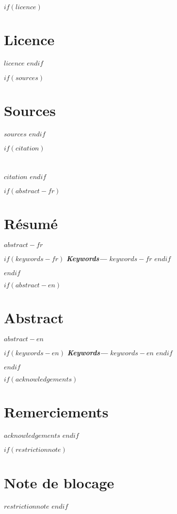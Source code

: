 \renewcommand{\contentsname}{Table des matières}
\renewcommand{\figurename}{Illustration}
\renewcommand{\listfigurename}{Table des figures}
\renewcommand{\listfigurename}{Table des figures}
\renewcommand{\listtablename}{Liste des tableaux}
\renewcommand{\chaptername}{Chapitre}
\renewcommand{\appendixname}{Annexe}

$if(licence)$
    \chapter*{Licence}
    $licence$
$endif$

$if(sources)$
    \chapter*{Sources}
    $sources$
$endif$

$if(citation)$
    \chapter*{}
    $citation$
$endif$

\providecommand{\keywords}[1]{\textbf{\textit{Keywords---}} #1}

$if(abstract-fr)$
\clearpage
\begin{minipage}{\linewidth}
    
    \chapter*{Résumé}
    $abstract-fr$
    
    \vspace*{1cm}
    
    $if(keywords-fr)$
        \keywords{$keywords-fr$}
    $endif$
    
\end{minipage}
\clearpage
$endif$

$if(abstract-en)$
    \clearpage
    \begin{minipage}{\linewidth}
    \chapter*{Abstract}
    $abstract-en$

    \vspace*{1cm}

    $if(keywords-en)$
        \keywords{$keywords-en$}
    $endif$

    \end{minipage}
    \clearpage
$endif$

$if(acknowledgements)$
\chapter*{Remerciements}
$acknowledgements$
$endif$

$if(restrictionnote)$
\chapter*{Note de blocage}
$restrictionnote$
$endif$

\cleardoublepage
